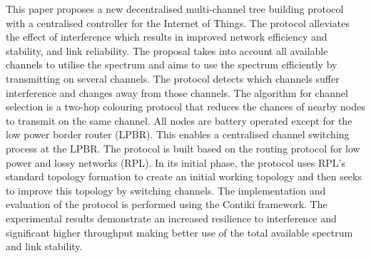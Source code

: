 This paper proposes a new decentralised multi-channel tree building protocol with a centralised controller for the Internet of Things. The protocol alleviates the effect of interference which results in improved network efficiency and stability, and link reliability. 
        The proposal takes into account all available channels to utilise the spectrum and aims to use the spectrum efficiently by transmitting on several channels. The protocol detects which channels suffer interference and changes away from those channels. The algorithm for channel selection is a two-hop colouring protocol that reduces the chances of nearby nodes to transmit on the same channel. 
        All nodes are battery operated except for the low power border router (LPBR). This enables a centralised channel switching process at the LPBR. The protocol is built based on the routing protocol for low power and lossy networks (RPL). In its initial phase, the protocol uses RPL's standard topology formation to create an initial working topology and then seeks to improve this topology by switching channels.
        The implementation and evaluation of the protocol is performed using the Contiki framework.
The experimental results demonstrate an increased resilience to interference and significant higher throughput making better use of the total available spectrum and link stability.